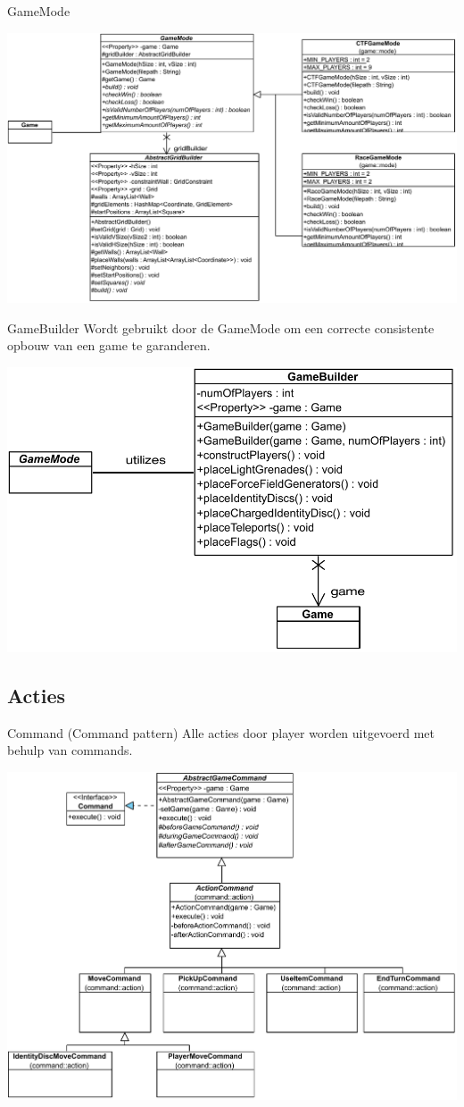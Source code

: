 \documentclass[11pt,t]{beamer}
\begin{document}
\begin{frame}{GameMode}
\begin{center}
\includegraphics[width=0.9\linewidth]{images/gamemode}
\end{center}
\end{frame}

\begin{frame}{GameBuilder}
Wordt gebruikt door de GameMode om een correcte consistente opbouw van een game te garanderen.
\begin{center}
\includegraphics[width=0.7\linewidth]{images/gamebuilder}
\end{center}
\end{frame}


\subsection{Acties}

\begin{frame}{Command (Command pattern)}
Alle acties door player worden uitgevoerd met behulp van commands.
\begin{center}
\includegraphics[width=0.7\linewidth]{images/command}
\end{center}
\end{frame}
\end{document}
